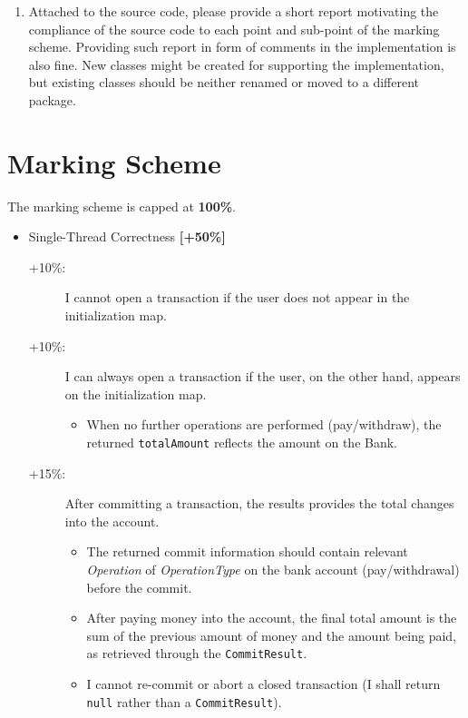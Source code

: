 \documentclass{article}
\begin{document}
\begin{enumerate}
		\item Attached to the source code, please provide a short report motivating the compliance of the source code to each point and sub-point of the marking scheme. Providing such report in form of comments in the implementation is also fine. New classes might be created for supporting the implementation, but  existing classes should be neither renamed or moved to a different package.
		
	\end{enumerate}


	\section*{Marking Scheme} 
\renewcommand{\labelitemii}{$\blacksquare$}
	The marking scheme is capped at  \textbf{100\%}.
	\begin{itemize}
		\item Single-Thread Correctness \textbf{[+50\%]}
			\begin{description}
			\item [+10\%:] I cannot open a transaction if the user does not appear in the initialization map.
			\item [+10\%:] I can always open a transaction if the user, on the other hand, appears on the initialization map.
	\begin{itemize}
				\item When no further operations are performed (pay/withdraw), the returned \texttt{totalAmount} reflects the amount on the Bank.
			\end{itemize}
			\item [+15\%:] After committing a transaction, the results provides the total changes into the account.
			\begin{itemize}
				\item The returned commit information should contain relevant \textit{Operation} of \textit{OperationType} on the bank account (pay/withdrawal) before the commit.
				\item After paying money into the account, the final total amount is the sum of the previous amount of money and the amount being paid, as retrieved through the \texttt{CommitResult}.
				\item I cannot re-commit or abort a closed transaction (I shall return \texttt{null} rather than a \texttt{CommitResult}).
				
			\end{itemize}


\end{description}
\end{itemize}
\end{document}
